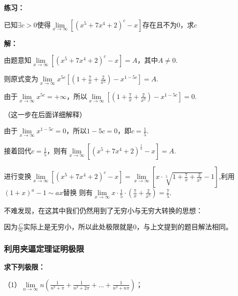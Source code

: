 \documentclass[12pt , a4paper , oneside]{ctexart}
\begin{document}
            \textbf{练习：}

            已知$\exists c>0$使得$\lim\limits_{x \to \infty}[ (x^5 + 7x^4 + 2)^c - x ]$存在且不为$0$，求$c$
            \begin{mdframed}
            \textbf{解：}

            由题意知$\lim\limits_{x \to \infty}[ (x^5 + 7x^4 + 2)^c - x ] = A$，其中$A \neq 0$.

            则原式变为$\lim\limits_{x \to \infty} x^{5c} [(1 + \frac{7}{x} + \frac{2}{x^5}) - x^{1-5c}] = A$.

            由于$\lim\limits_{x \to \infty} x^{5c} = +\infty$，所以$\lim\limits_{x \to \infty} [(1 + \frac{7}{x} + \frac{2}{x^5}) - x^{1-5c}] = 0$.

            {\fangsong （这一步在后面详细解释）}

            由于$\lim\limits_{x \to \infty} x^{1-5c} = 0$，所以$1-5c = 0$，即$c = \frac{1}{5}$.

            接着回代$c = \frac{1}{5}$，则有$\lim\limits_{x \to \infty} [ (x^5 + 7x^4 + 2)^\frac{1}{5} - x ] = A$.

            进行变换$\lim\limits_{x \to \infty}[ (x^5 + 7x^4 + 2)^c - x ] = 
            \lim\limits_{x \to \infty}[x \cdot \sqrt[5]{1+\frac{7}{x}+\frac{2}{x^5}} - 1 ]$,利用$(1+x)^a -1 \sim ax$替换
            则有$\lim\limits_{x \to \infty} x \cdot \frac{1}{5} \cdot (\frac{7}{x} + \frac{2}{x^5}) = \frac{7}{5}$.

            \end{mdframed}

            不难发现，在这其中我们仍然用到了无穷小与无穷大转换的思想：

            \begin{center}
            \end{center}

            因为$\frac{C}{\infty}$实际上是无穷小，所以此处极限就是$0$，与上文提到的题目解法相同。

            \subsubsection{利用夹逼定理证明极限}
            
            \textbf{求下列极限：}

            （1）$\lim\limits_{n \to \infty} n(\frac{1}{n^2 + \pi} + \frac{1}{n^2 + 2\pi}
            + ... + \frac{1}{n^2 + n\pi})$；
\end{document}
